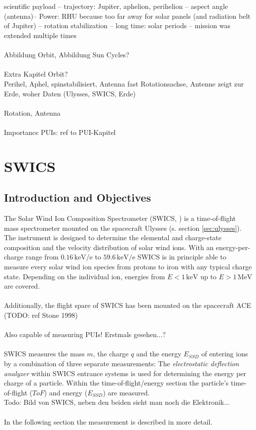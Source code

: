 \\ \\
scientific payload  -- trajectory: Jupiter, aphelion, perihelion -- aspect angle (antenna)-- Power: RHU because too far away for solar panels (and radiation belt of Jupiter) -- rotation stabilization -- long time: solar periods -- mission was extended multiple times
\\ \\
Abbildung Orbit, Abbildung Sun Cycles?
\\ \\ 
Extra Kapitel Orbit? \\
Perihel, Aphel, spinstabilisiert, Antenna fast Rotationsachse, Antenne zeigt zur Erde, woher Daten (Ulysses, SWICS, Erde)
\\ \\
Rotation, Antenna
\\ \\ 
Importance PUIs: ref to PUI-Kapitel
%
%
%
%
%
\section{SWICS}

\subsection{Introduction and Objectives}
The Solar Wind Ion Composition Spectrometer (SWICS, \citet{gloeckler_1992}) is a time-of-flight mass spectrometer mounted on the spacecraft Ulysses (s. section \ref{sec:ulysses}). The instrument is designed to determine the elemental and charge-state composition and the velocity distribution of solar wind ions. With an energy-per-charge range from $0.16 \, \mathrm{keV/e}$ to $59.6 \, \mathrm{keV / e}$ SWICS is in principle able to measure every solar wind ion species from protons to iron with any typical charge state. Depending on the individual ion, energies from $E < 1 \,\mathrm{keV}$ up to $E > 1 \, \mathrm{MeV}$ are covered.
\\ \\
Additionally, the flight spare of SWICS has been mounted on the spacecraft ACE (TODO: ref Stone 1998)
\\ \\ 
Also capable of measuring PUIs! Erstmals gesehen...?
\\ \\
SWICS measures the mass $m$, the charge $q$ and the energy $E_{SSD}$ of entering ions by a combination of three separate measurements: The \textit{electrostatic deflection analyzer} within SWICS entrance systems is used for determining the energy per charge of a particle. Within the time-of-flight/energy section the particle's time-of-flight ($ToF$) and energy ($E_{SSD}$) are measured. \\ 
Todo: Bild von SWICS, neben den beiden sieht man noch die Elektronik...
\\ \\
In the following section the measurement is described in more detail.
